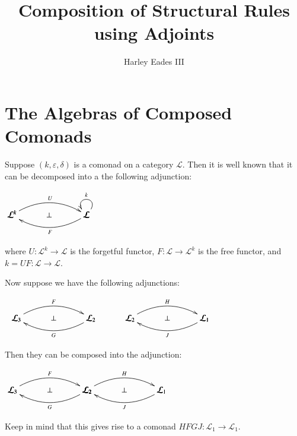 \documentclass{article}
\date{}
\title{Composition of Structural Rules using Adjoints}
\author{Harley Eades III}
\let\mto\to
\let\to\relax
\newcommand{\to}{\rightarrow}
\newcommand{\cat}[1]{\mathcal{#1}}
\begin{document}
\maketitle 

\section{The Algebras of Composed Comonads}
\label{sec:the_algebras_of_composed_comonads}
Suppose $(k,\varepsilon,\delta)$ is a comonad on a category $\cat{L}$.
Then it is well known that it can be decomposed into a the following
adjunction:
\begin{center}
  \begin{math}
    \bfig
    \Loop(900,0)\cat{L}(ur,ul)_k
    \morphism(0,0)|a|/{@{>}@/^1.5em/}/<900,0>[\cat{L}^k`\cat{L};U]
    \morphism(0,0)|b|/{@{<-}@/_1.5em/}/<900,0>[\cat{L}^k`\cat{L};F]
    \place(450,0)[\perp]
    \efig
  \end{math}
\end{center}
where $U : \cat{L}^k \mto \cat{L}$ is the forgetful functor, $F :
\cat{L} \mto \cat{L}^k$ is the free functor, and $k = UF : \cat{L}
\mto \cat{L}$.

Now suppose we have the following adjunctions:
\begin{center}
  \begin{math}
    \begin{array}{lll}
      \bfig
      \morphism(0,0)|a|/{@{>}@/^1.5em/}/<900,0>[\cat{L}_3`\cat{L}_2;F]
      \morphism(0,0)|b|/{@{<-}@/_1.5em/}/<900,0>[\cat{L}_3`\cat{L}_2;G]
      \place(450,0)[\perp]
      \efig
      & \quad &
      \bfig
      \morphism(0,0)|a|/{@{>}@/^1.5em/}/<900,0>[\cat{L}_2`\cat{L}_1;H]
      \morphism(0,0)|b|/{@{<-}@/_1.5em/}/<900,0>[\cat{L}_2`\cat{L}_1;J]
      \place(450,0)[\perp]
      \efig
    \end{array}
  \end{math}
\end{center}
Then they can be composed into the adjunction:
\begin{center}
  \begin{math}
      \bfig
      \morphism(0,0)|a|/{@{>}@/^1.5em/}/<900,0>[\cat{L}_3`\cat{L}_2;F]
      \morphism(0,0)|b|/{@{<-}@/_1.5em/}/<900,0>[\cat{L}_3`\cat{L}_2;G]
      \place(450,0)[\perp]

      \morphism(900,0)|a|/{@{>}@/^1.5em/}/<900,0>[\cat{L}_2`\cat{L}_1;H]
      \morphism(900,0)|b|/{@{<-}@/_1.5em/}/<900,0>[\cat{L}_2`\cat{L}_1;J]
      \place(1350,0)[\perp]
      \efig
  \end{math}
\end{center}
Keep in mind that this gives rise to a comonad $HFGJ : \cat{L}_1 \mto
\cat{L}_1$.
\end{document}
